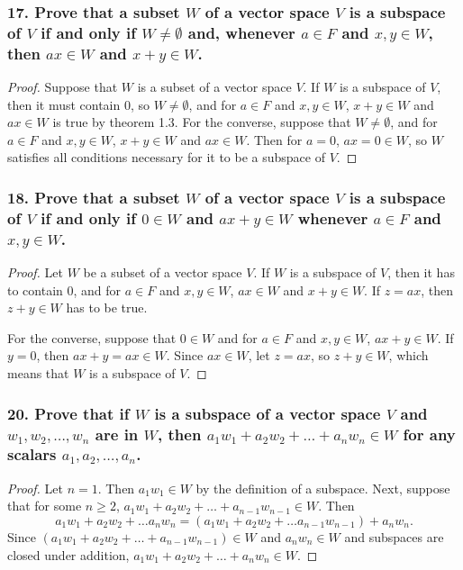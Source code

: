 \documentclass{article}
\begin{document}
\subsubsection*{17. Prove that a subset $W$ of a vector space $V$ is a subspace of $V$ if and only if $W \ne \emptyset$ and, whenever $a \in F$ and $x, y \in W$, then $ax \in W$ and $x + y \in W$.}
\begin{proof}
	Suppose that $W$ is a subset of a vector space $V$. If $W$ is a subspace of $V$, then it must contain $0$, so $W \ne \emptyset$, and for $a \in F$ and $x,y \in W$, $x + y \in W$ and $ax \in W$ is true by theorem 1.3. For the converse, suppose that $W \ne \emptyset$, and for $a \in F$ and $x,y \in W$, $x + y \in W$ and $ax \in W$. Then for $a = 0$, $ax = 0 \in W$, so $W$ satisfies all conditions necessary for it to be a subspace of $V$.
\end{proof}

\subsubsection*{18. Prove that a subset $W$ of a vector space $V$ is a subspace of $V$ if and only if $0 \in W$ and $ax + y \in W$ whenever $a \in F$ and $x,y \in W$.}
\begin{proof}
	Let $W$ be a subset of a vector space $V$. If $W$ is a subspace of $V$, then it has to contain $0$, and for $a \in F$ and $x, y\in W$, $ax \in W$ and $x + y \in W$. If $z = ax$, then $z + y \in W$ has to be true.

	For the converse, suppose that $0 \in W$ and for $a \in F$ and $x,y \in W$, $ax + y \in W$. If $y = 0$, then $ax + y = ax \in W$. Since $ax \in W$, let $z = ax$, so $z + y \in W$, which means that $W$ is a subspace of $V$.
\end{proof}

\subsubsection*{20. Prove that if $W$ is a subspace of a vector space $V$ and $w_1, w_2, \dots, w_n$ are in $W$, then $a_1w_1 + a_2w_2 + \dots + a_nw_n \in W$ for any scalars $a_1, a_2, \dots, a_n$.}
\begin{proof}
	Let $n = 1$. Then $a_1w_1 \in W$ by the definition of a subspace. Next, suppose that for some $n \ge 2$, $a_1w_1 + a_2w_2 + \dots + a_{n-1}w_{n-1} \in W$. Then \[ a_1w_1 + a_2w_2 + \dots a_nw_n = (a_1w_1 + a_2w_2 + \dots a_{n-1}w_{n-1}) + a_nw_n. \] Since $(a_1w_1 + a_2w_2 + \dots + a_{n-1}w_{n-1}) \in W$ and $a_nw_n \in W$ and subspaces are closed under addition, $a_1w_1 + a_2w_2 + \dots + a_nw_n \in W$.
\end{proof}
\end{document}
